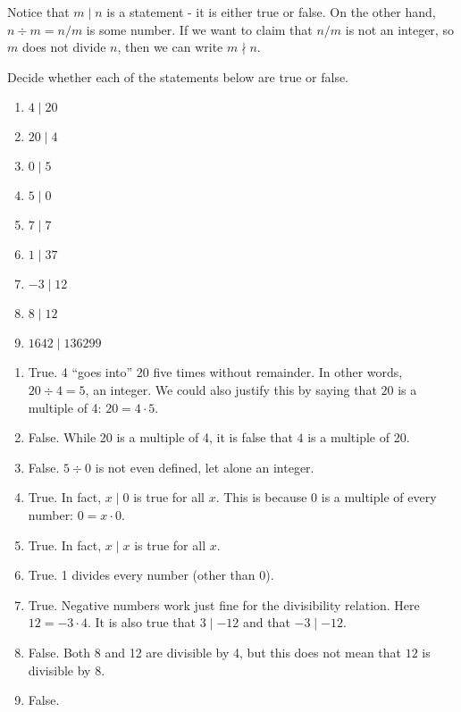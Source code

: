 \documentclass[12pt]{article}
\begin{document}
Notice that $m \mid n$ is a statement - it is either true or false.  On the other hand, $n \div m = n/m$ is some number.  If we want to claim that $n/m$ is not an integer, so $m$ does not divide $n$, then we can write $m \nmid n$.  

\begin{example}
	Decide whether each of the statements below are true or false.
	\begin{multicols}{3}
		\begin{enumerate}
			\item $4 \mid 20$
			\item $20 \mid 4$
			\item $0 \mid 5$
			\item $5 \mid 0$
			\item $7 \mid 7$
			\item $1 \mid 37$		
			\item $-3 \mid 12$
			\item $8 \mid 12$
			\item $1642 \mid 136299$
		\end{enumerate}
	\end{multicols}
	
	\begin{solution}
		\begin{enumerate}
			\item True.  4 ``goes into'' 20 five times without remainder.  In other words, $20 \div 4 = 5$, an integer. We could also justify this by saying that $20$ is a multiple of 4: $20 = 4\cdot 5$.
			\item False. While 20 is a multiple of 4, it is false that $4$ is a multiple of 20.  
			\item False.  $5 \div 0$ is not even defined, let alone an integer.  
			\item True.  In fact, $x \mid 0$ is true for all $x$.  This is because 0 is a multiple of every number: $0 = x\cdot 0$.
			\item True.  In fact, $x \mid x$ is true for all $x$.
			\item True.  1 divides every number (other than 0).
			\item True.  Negative numbers work just fine for the divisibility relation.  Here $12 = -3 \cdot 4$.	It is also true that $3 \mid -12$ and that $-3 \mid -12$.
			\item False.  Both 8 and 12 are divisible by 4, but this does not mean that $12$ is divisible by $8$.
			\item False.  
		\end{enumerate}
	\end{solution}
\end{example}
\end{document}
